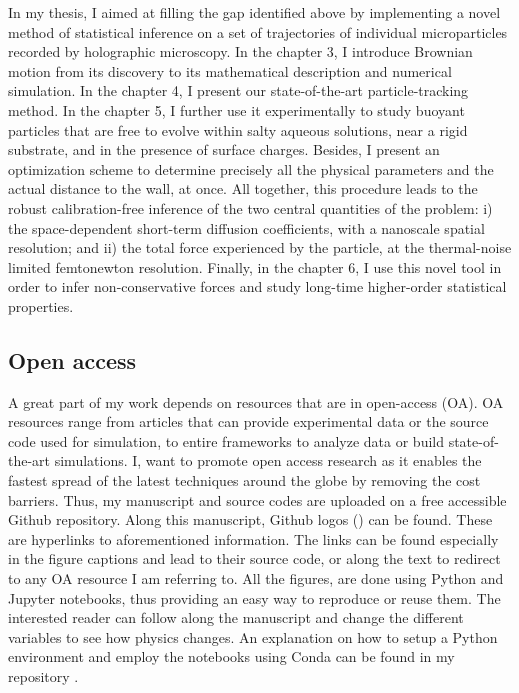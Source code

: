 In my thesis, I aimed at filling the gap identified above by implementing a novel method of statistical inference on a set of trajectories of individual microparticles recorded by holographic microscopy. In the chapter 3, I introduce Brownian motion from its discovery to its mathematical description and numerical simulation. In the chapter 4, I present our state-of-the-art particle-tracking method. In the chapter 5, I further use it experimentally to study  buoyant particles that are free to evolve within salty aqueous solutions, near a rigid substrate, and in the presence of surface charges. Besides, I present an optimization scheme to determine precisely all the physical parameters and the actual distance to the wall, at once. All together, this procedure leads to the robust calibration-free inference of the two central quantities of the problem: i) the space-dependent short-term diffusion coefficients, with a nanoscale spatial resolution; and ii) the total force experienced by the particle, at the thermal-noise limited femtonewton resolution. Finally, in the chapter 6, I use this novel tool in order to infer non-conservative forces and study long-time higher-order statistical properties.



\subsection{Open access}

A great part of my work depends on resources that are in open-access (OA). OA resources range from articles that can provide experimental data or the source code used for simulation, to entire frameworks to analyze data or build state-of-the-art simulations. I, want to promote open access research as it enables the fastest spread of the latest techniques around the globe by removing the cost barriers. Thus, my manuscript and source codes are uploaded on a free accessible Github repository. Along this manuscript, Github logos (\href{https://github.com/eXpensia/Ma-these/}{\faGithub}) can be found. These are hyperlinks to aforementioned information. The links can be found especially in the figure captions and lead to their source code, or along the text to redirect to any OA resource I am referring to. All the figures, are done using Python and Jupyter notebooks, thus providing an easy way to reproduce or reuse them. The interested reader can follow along the manuscript and change the different variables to see how physics changes.  An explanation on how to setup a Python environment and employ the notebooks using Conda can be found in my repository \href{https://github.com/eXpensia/Ma-these/}{\faGithub}.



